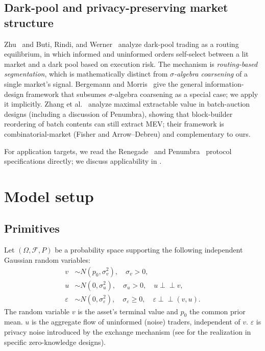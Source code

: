 \documentclass[runningheads]{llncs}
\newcommand{\indep}{\perp\!\!\!\perp}
\newcommand{\sigv}{\sigma_v}
\newcommand{\sigu}{\sigma_u}
\newcommand{\sige}{\sigma_\varepsilon}
\begin{document}
\subsection{Dark-pool and privacy-preserving market structure}

Zhu~\cite{zhu2014darkpools} and Buti, Rindi, and
Werner~\cite{buti2017darkpool} analyze dark-pool trading as a
routing equilibrium, in which informed and uninformed orders
self-select between a lit market and a dark pool based on
execution risk. The mechanism is \emph{routing-based segmentation},
which is mathematically distinct from \emph{$\sigma$-algebra
coarsening} of a single market's signal. Bergemann and
Morris~\cite{bergemann2019infodesign} give the general
information-design framework that subsumes $\sigma$-algebra
coarsening as a special case; we apply it implicitly. Zhang et
al.~\cite{zhang2025mevbatch} analyze maximal extractable value in
batch-auction designs (including a discussion of Penumbra), showing
that block-builder reordering of batch contents can still extract
MEV; their framework is combinatorial-market (Fisher and
Arrow--Debreu) and complementary to ours.

For application targets, we read the
Renegade~\cite{renegade-wp} and Penumbra~\cite{penumbra-docs}
protocol specifications directly; we discuss applicability in
.

\section{Model setup}
\label{sec:setup}

\subsection{Primitives}

Let $(\Omega, \mathcal{F}, P)$ be a probability space supporting
the following independent Gaussian random variables:
\begin{align*}
v &\sim N(p_0, \sigv^2), \quad \sigv > 0, \\
u &\sim N(0, \sigu^2), \quad \sigu > 0, \quad u \indep v, \\
\varepsilon &\sim N(0, \sige^2), \quad \sige \geq 0, \quad
\varepsilon \indep (v, u).
\end{align*}
The random variable $v$ is the asset's terminal value and $p_0$ the
common prior mean. $u$ is the aggregate flow of uninformed
(noise) traders, independent of $v$. $\varepsilon$ is privacy
noise introduced by the exchange mechanism (see
 for the realization in specific
zero-knowledge designs).
\end{document}
